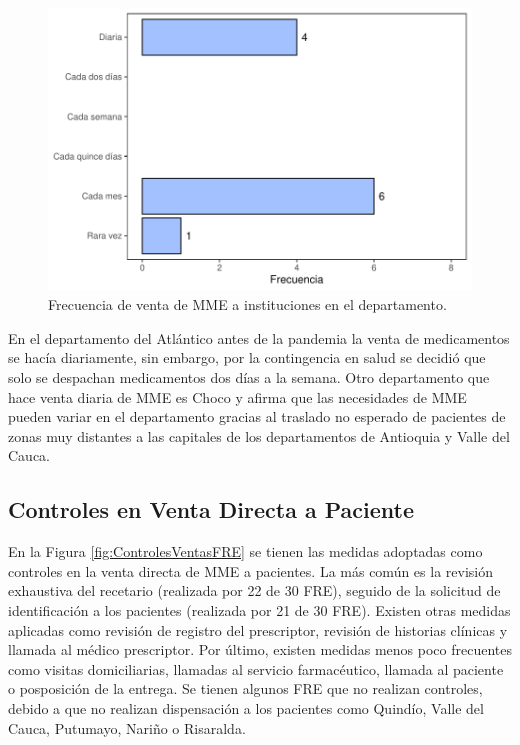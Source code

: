 \documentclass[
]{book}
\begin{document}
\begin{figure}[t]

{\centering \includegraphics[width=0.9\linewidth]{InformeFinal_files/figure-latex/FrecVentaInstituciones-1} 

}

\caption{Frecuencia de venta de MME a instituciones en el departamento.}\label{fig:FrecVentaInstituciones}
\end{figure}

En el departamento del Atlántico antes de la pandemia la venta de medicamentos se hacía diariamente, sin embargo, por la contingencia en salud se decidió que solo se despachan medicamentos dos días a la semana. Otro departamento que hace venta diaria de MME es Choco y afirma que las necesidades de MME pueden variar en el departamento gracias al traslado no esperado de pacientes de zonas muy distantes a las capitales de los departamentos de Antioquia y Valle del Cauca.

\hypertarget{controles-en-venta-directa-a-paciente}{%
\subsection{Controles en Venta Directa a Paciente}\label{controles-en-venta-directa-a-paciente}}

En la Figura \ref{fig:ControlesVentasFRE} se tienen las medidas adoptadas como controles en la venta directa de MME a pacientes. La más común es la revisión exhaustiva del recetario (realizada por 22 de 30 FRE), seguido de la solicitud de identificación a los pacientes (realizada por 21 de 30 FRE). Existen otras medidas aplicadas como revisión de registro del prescriptor, revisión de historias clínicas y llamada al médico prescriptor. Por último, existen medidas menos poco frecuentes como visitas domiciliarias, llamadas al servicio farmacéutico, llamada al paciente o posposición de la entrega. Se tienen algunos FRE que no realizan controles, debido a que no realizan dispensación a los pacientes como Quindío, Valle del Cauca, Putumayo, Nariño o Risaralda.
\end{document}
